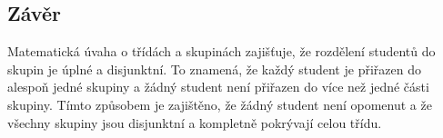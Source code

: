 \subsection*{Závěr}

Matematická úvaha o třídách a skupinách zajišťuje, že rozdělení studentů do skupin je úplné a disjunktní. To znamená, že každý student je přiřazen do alespoň jedné skupiny a žádný student není přiřazen do více než jedné části skupiny. Tímto způsobem je zajištěno, že žádný student není opomenut a že všechny skupiny jsou disjunktní a kompletně pokrývají celou třídu.

